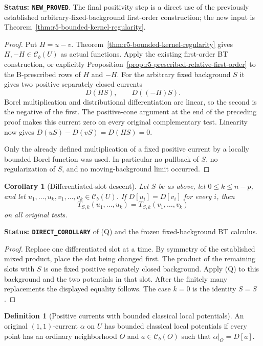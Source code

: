 \documentclass[11pt,a4paper]{article}
\numberwithin{equation}{section}
\newtheorem{corollary}[theorem]{Corollary}
\theoremstyle{definition}
\newtheorem{definition}[theorem]{Definition}
\theoremstyle{remark}
\begin{document}
\noindent\textbf{Status: \texttt{NEW\_PROVED}}. The final
positivity step is a direct use of the previously established
arbitrary-fixed-background first-order construction; the new
input is Theorem~\ref{thm:r5-bounded-kernel-regularity}.

\begin{proof}
Put $H=u-v$. Theorem~\ref{thm:r5-bounded-kernel-regularity}
gives $H,-H\in\mathcal C_b(U)$ as actual functions.
Apply the existing first-order BT construction, or explicitly
Proposition~\ref{prop:r5-prescribed-relative-first-order} to
the B-prescribed rows of $H$ and $-H$. For the arbitrary
fixed background $S$ it gives two positive separately
closed currents
\[
                         D(HS),\qquad D((-H)S).
\]
Borel multiplication and distributional differentiation are
linear, so the second is the negative of the first.
The positive-cone argument at the end of the preceding proof
makes this current zero on every original complementary test.
Linearity now gives $D(uS)-D(vS)=D(HS)=0$.

Only the already defined multiplication of a fixed positive
current by a locally bounded Borel function was used. In
particular no pullback of $S$, no regularization of $S$, and
no moving-background limit occurred.
\end{proof}

\begin{corollary}[Differentiated-slot descent]
\label{cor:r5-differentiated-slot-quotient}
Let $S$ be as above, let $0\leq k\leq n-p$, and let
$u_1,\ldots,u_k,v_1,\ldots,v_k\in\mathcal C_b(U)$.
If $D[u_i]=D[v_i]$ for every $i$, then
\[
              T_{S,k}(u_1,\ldots,u_k)
                    =T_{S,k}(v_1,\ldots,v_k)
\]
on all original tests.
\end{corollary}

\noindent\textbf{Status: \texttt{DIRECT\_COROLLARY}} of (Q)
and the frozen fixed-background BT calculus.

\begin{proof}
Replace one differentiated slot at a time. By symmetry of
the established mixed product, place the slot being changed
first. The product of the remaining slots with $S$ is one
fixed positive separately closed background. Apply (Q) to
this background and the two potentials in that slot.
After the finitely many replacements the displayed equality
follows. The case $k=0$ is the identity $S=S$.
\end{proof}

\begin{definition}[Positive currents with bounded classical local potentials]
\label{def:r5-classical-potential-current}
An original $(1,1)$-current $\alpha$ on $U$ has bounded
classical local potentials if every point has an ordinary
neighborhood $O$ and $a\in\mathcal C_b(O)$ such that
$\alpha|_O=D[a]$.
\end{definition}
\end{document}
